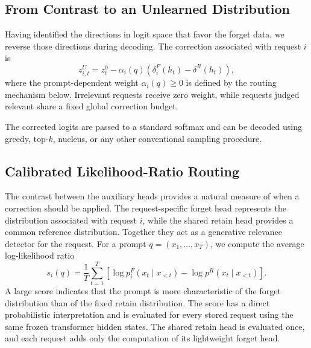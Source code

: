 \documentclass[11pt]{article}
\begin{document}
\subsection{From Contrast to an Unlearned Distribution}

Having identified the directions in logit space that favor the forget data, we reverse those directions during decoding. The correction associated with request $i$ is
\begin{equation}
    z_{i,t}^U=z_t^0-\alpha_i(q)
    \left(\delta_i^F(h_t)-\delta^R(h_t)\right),
\end{equation}
where the prompt-dependent weight $\alpha_i(q)\geq0$ is defined by the routing mechanism below. Irrelevant requests receive zero weight, while requests judged relevant share a fixed global correction budget.

The corrected logits are passed to a standard softmax and can be decoded using greedy, top-$k$, nucleus, or any other conventional sampling procedure.

\subsection{Calibrated Likelihood-Ratio Routing}

The contrast between the auxiliary heads provides a natural measure of when a correction should be applied. The request-specific forget head represents the distribution associated with request $i$, while the shared retain head provides a common reference distribution. Together they act as a generative relevance detector for the request. For a prompt $q=(x_1,\ldots,x_T)$, we compute the average log-likelihood ratio
\begin{equation}
    s_i(q)=\frac{1}{T}\sum_{t=1}^{T}
    \left[
    \log p_i^F(x_t\mid x_{<t})
    -\log p^R(x_t\mid x_{<t})
    \right].
\end{equation}
A large score indicates that the prompt is more characteristic of the forget distribution than of the fixed retain distribution. The score has a direct probabilistic interpretation and is evaluated for every stored request using the same frozen transformer hidden states. The shared retain head is evaluated once, and each request adds only the computation of its lightweight forget head.
\end{document}
